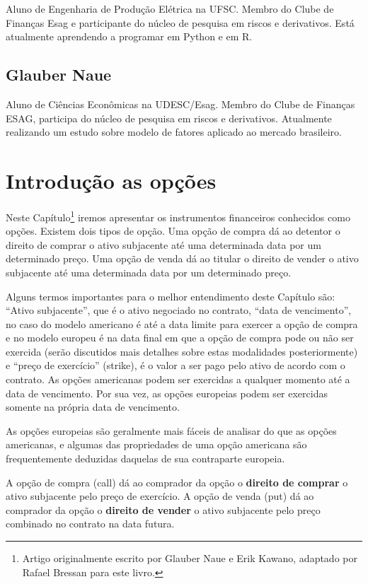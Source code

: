 \documentclass[]{book}
\let\rmarkdownfootnote\footnote%
\def\footnote{\protect\rmarkdownfootnote}
\begin{document}
Aluno de Engenharia de Produção Elétrica na UFSC. Membro do Clube de
Finanças Esag e participante do núcleo de pesquisa em riscos e
derivativos. Está atualmente aprendendo a programar em Python e em R.

\section*{Glauber Naue}\label{glauber-naue}

Aluno de Ciências Econômicas na UDESC/Esag. Membro do Clube de Finanças
ESAG, participa do núcleo de pesquisa em riscos e derivativos.
Atualmente realizando um estudo sobre modelo de fatores aplicado ao
mercado brasileiro.

\chapter{Introdução as opções}\label{opcoes}

Neste Capítulo\footnote{Artigo originalmente escrito por Glauber Naue e
  Erik Kawano, adaptado por Rafael Bressan para este livro.} iremos
apresentar os instrumentos financeiros conhecidos como opções. Existem
dois tipos de opção. Uma opção de compra dá ao detentor o direito de
comprar o ativo subjacente até uma determinada data por um determinado
preço. Uma opção de venda dá ao titular o direito de vender o ativo
subjacente até uma determinada data por um determinado preço.

Alguns termos importantes para o melhor entendimento deste Capítulo são:
``Ativo subjacente'', que é o ativo negociado no contrato, ``data de
vencimento'', no caso do modelo americano é até a data limite para
exercer a opção de compra e no modelo europeu é na data final em que a
opção de compra pode ou não ser exercida (serão discutidos mais detalhes
sobre estas modalidades posteriormente) e ``preço de exercício''
(strike), é o valor a ser pago pelo ativo de acordo com o contrato. As
opções americanas podem ser exercidas a qualquer momento até a data de
vencimento. Por sua vez, as opções europeias podem ser exercidas somente
na própria data de vencimento.

As opções europeias são geralmente mais fáceis de analisar do que as
opções americanas, e algumas das propriedades de uma opção americana são
frequentemente deduzidas daquelas de sua contraparte europeia.

A opção de compra (call) dá ao comprador da opção o \textbf{direito de
comprar} o ativo subjacente pelo preço de exercício. A opção de venda
(put) dá ao comprador da opção o \textbf{direito de vender} o ativo
subjacente pelo preço combinado no contrato na data futura.
\end{document}
